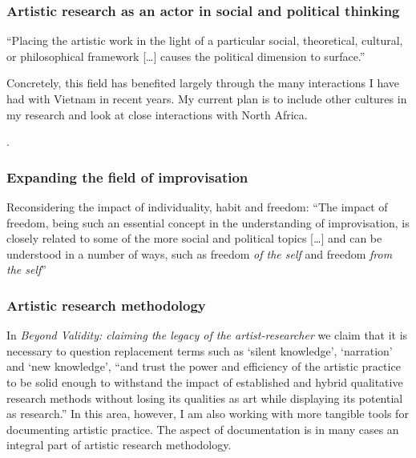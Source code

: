 \documentclass{beamer}
\begin{document}

\begin{frame}
\frametitle{Artistic research as an actor in social and political thinking}

``Placing the artistic work in the light of a particular social, theoretical, cultural, or philosophical framework [\ldots] causes the political dimension to surface.'' 

Concretely, this field has benefited largely through the many interactions I have had with Vietnam in recent years. My current plan is to include other cultures in my research and look at close interactions with North Africa.

\vspace{0.5cm}
. 

\end{frame}


\begin{frame}
\frametitle{Expanding the field of improvisation}

Reconsidering the impact of individuality, habit and freedom: ``The impact of freedom, being such an essential concept in the understanding of improvisation, is closely related to some of the more social and political topics [\ldots] and can be understood in a number of ways, such as freedom \emph{of the self} and freedom \emph{from the self}'' 

\vspace{0.5cm}

\end{frame}


\begin{frame}
\frametitle{Artistic research methodology}

In \emph{Beyond Validity: claiming the legacy of the artist-researcher} we claim that it is necessary to question replacement terms such as `silent knowledge', `narration' and `new knowledge', ``and trust the power and efficiency of the artistic practice to be solid enough to withstand the impact of established and hybrid qualitative research methods without losing its qualities as art while displaying its potential as research.'' In this area, however, I am also working with more tangible tools for documenting artistic practice. The aspect of documentation is in many cases an integral part of artistic research methodology.

\vspace{0.5cm}
\end{frame}
\end{document}
